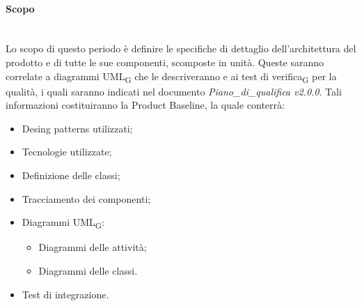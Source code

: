 	\paragraph {Scopo}\mbox{}\\
	Lo scopo di questo periodo è definire le specifiche di dettaglio dell’architettura del prodotto e di tutte le sue componenti, scomposte in unità. Queste saranno correlate a diagrammi UML\textsubscript{G} che le descriveranno e ai test di verifica\textsubscript{G} per la qualità, i quali saranno indicati nel documento \textit{Piano\_di\_qualifica v2.0.0}. Tali informazioni costituiranno la Product Baseline, la quale conterrà:
	\begin{itemize}
		\item Desing patterns utilizzati;
		\item Tecnologie utilizzate;
		\item Definizione delle classi;
		\item Tracciamento dei componenti;
		\item Diagrammi UML\textsubscript{G}:
		\begin{itemize}
			\item Diagrammi delle attività;
			\item Diagrammi delle classi.
		\end{itemize}
		\item Test di integrazione.
	\end{itemize}
